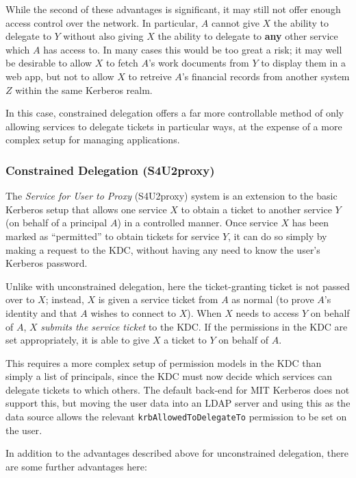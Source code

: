 \documentclass{article}
\begin{document}
While the second of these advantages is significant, it may still not offer enough access control over the network. In particular, $A$ cannot give $X$ the ability to delegate to $Y$ without also giving $X$ the ability to delegate to \textbf{any} other service which $A$ has access to. In many cases this would be too great a risk; it may well be desirable to allow $X$ to fetch $A$'s work documents from $Y$ to display them in a web app, but not to allow $X$ to retreive $A$'s financial records from another system $Z$ within the same Kerberos realm.

In this case, constrained delegation offers a far more controllable method of only allowing services to delegate tickets in particular ways, at the expense of a more complex setup for managing applications.

\subsubsection{Constrained Delegation (S4U2proxy)}
The \textit{Service for User to Proxy} (S4U2proxy) system is an extension to the basic Kerberos setup that allows one service $X$ to obtain a ticket to another service $Y$ (on behalf of a principal $A$) in a controlled manner. Once service $X$ has been marked as ``permitted'' to obtain tickets for service $Y$, it can do so simply by making a request to the KDC, without having any need to know the user's Kerberos password\cite{MS-s4u2}.

Unlike with unconstrained delegation, here the ticket-granting ticket is not passed over to $X$; instead, $X$ is given a service ticket from $A$ as normal (to prove $A$'s identity and that $A$ wishes to connect to $X$). When $X$ needs to access $Y$ on behalf of $A$, $X$ \textit{submits the service ticket} to the KDC. If the permissions in the KDC are set appropriately, it is able to give $X$ a ticket to $Y$ on behalf of $A$.

This requires a more complex setup of permission models in the KDC than simply a list of principals, since the KDC must now decide which services can delegate tickets to which others. The default back-end for MIT Kerberos does not support this, but moving the user data into an LDAP server and using this as the data source allows the relevant \texttt{krbAllowedToDelegateTo} permission to be set on the user\cite{KRB-DELEG}.

In addition to the advantages described above for unconstrained delegation, there are some further advantages here:
\end{document}
